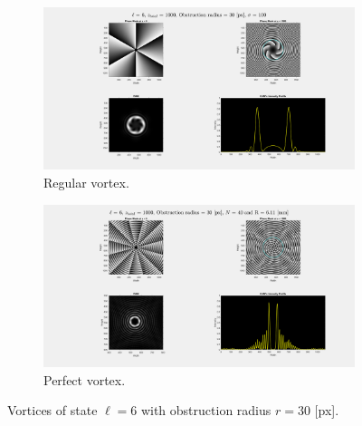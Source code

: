 \begin{figure}[htbp]
    \centering
    \begin{subfigure}[b]{0.45\textwidth}
        \centering
        \includegraphics[width=\textwidth]{images/Appendices/Additional_Results/Topological_Charge/reg_6_r30.png}
        \caption{Regular vortex.}
    \end{subfigure}
    \hfill
    \begin{subfigure}[b]{0.45\textwidth}
        \centering
        \includegraphics[width=\textwidth]{images/Appendices/Additional_Results/Topological_Charge/per_6_r30.png}
        \caption{Perfect vortex.}
    \end{subfigure}
    \caption{Vortices of state $\ell = 6$ with obstruction radius $r=30$ [px].}
    \label{fig:Vortices_L=6_r=30}
\end{figure}

